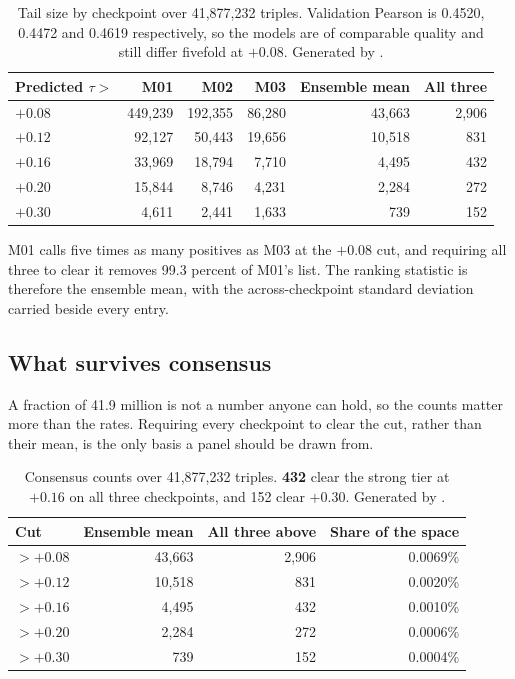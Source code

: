 \begin{table}[H]
\centering
\footnotesize
\begin{tabular}{lrrrrr}
\toprule
Predicted $\tau >$ & M01 & M02 & M03 & Ensemble mean & All three \\
\midrule
$+0.08$ & 449{,}239 & 192{,}355 & 86{,}280 & 43{,}663 & 2{,}906 \\
$+0.12$ &  92{,}127 &  50{,}443 & 19{,}656 & 10{,}518 &   831 \\
$+0.16$ &  33{,}969 &  18{,}794 &  7{,}710 &  4{,}495 &   432 \\
$+0.20$ &  15{,}844 &   8{,}746 &  4{,}231 &  2{,}284 &   272 \\
$+0.30$ &   4{,}611 &   2{,}441 &  1{,}633 &    739 &   152 \\
\bottomrule
\end{tabular}
\caption{Tail size by checkpoint over 41{,}877{,}232 triples. Validation Pearson
is 0.4520, 0.4472 and 0.4619 respectively, so the models are of comparable
quality and still differ fivefold at $+0.08$. Generated by
\protect{}.}
\end{table}

M01 calls five times as many positives as M03 at the $+0.08$ cut, and requiring
all three to clear it removes 99.3 percent of M01's list. The ranking statistic is
therefore the ensemble mean, with the across-checkpoint standard deviation carried
beside every entry.

\subsection{What survives consensus}

A fraction of 41.9 million is not a number anyone can hold, so the counts matter
more than the rates. Requiring every checkpoint to clear the cut, rather than
their mean, is the only basis a panel should be drawn from.

\begin{table}[H]
\centering
\footnotesize
\begin{tabular}{lrrr}
\toprule
Cut & Ensemble mean & All three above & Share of the space \\
\midrule
$>+0.08$ & 43{,}663 & 2{,}906 & 0.0069\% \\
$>+0.12$ & 10{,}518 &   831 & 0.0020\% \\
$>+0.16$ &  4{,}495 &   432 & 0.0010\% \\
$>+0.20$ &  2{,}284 &   272 & 0.0006\% \\
$>+0.30$ &    739 &   152 & 0.0004\% \\
\bottomrule
\end{tabular}
\caption{Consensus counts over 41{,}877{,}232 triples. \textbf{432} clear the
strong tier at $+0.16$ on all three checkpoints, and 152 clear $+0.30$. Generated
by \protect{}.}
\end{table}

